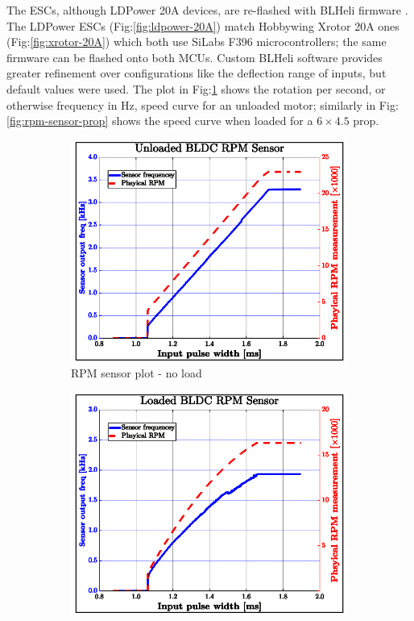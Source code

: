\par
The ESCs, although LDPower 20A devices, are re-flashed with BLHeli firmware \cite{BLHeli}. The LDPower ESCs (Fig:\ref{fig:ldpower-20A}) match Hobbywing Xrotor 20A ones (Fig:\ref{fig:xrotor-20A}) which both use SiLabs F396 microcontrollers; the same firmware can be flashed onto both MCUs. Custom BLHeli software provides greater refinement over configurations like the deflection range of inputs, but default values were used. The plot in Fig:\ref{fig:rpm-sensor-noload} shows the rotation per second, or otherwise frequency in Hz, speed curve for an unloaded motor; similarly in Fig:\ref{fig:rpm-sensor-prop} shows the speed curve when loaded for a $6\times 4.5$ prop. 
\begin{figure}[htbp]
\begin{subfigure}{0.5\textwidth}
\centering
\includegraphics[width=\textwidth]{graphs/rpm-sensor-noload}
\caption{RPM sensor plot - no load}
\label{fig:rpm-sensor-noload}
\end{subfigure}
\begin{subfigure}{0.5\textwidth}
\centering
\includegraphics[width=\textwidth]{graphs/rpm-sensor-prop}

\end{subfigure}
\end{figure}
